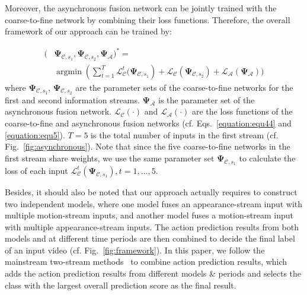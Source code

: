 \documentclass[letterpaper]{article} %
\DeclareMathOperator*{\argmin}{argmin}
\begin{document}

Moreover, the asynchronous fusion network can be jointly trained with the coarse-to-fine network by combining their loss functions. Therefore, the overall framework of our approach can be trained by:


\begin{equation}
\begin{aligned}
(&\mathbf{\Psi}_{\mathcal{C},s_1},\mathbf{\Psi}_{\mathcal{C},s_2},\mathbf{\Psi}_{\mathcal{A}})^*= \\ &\mathop{\argmin}{(\sum_{t=1}^T{\mathcal{L}_{\mathcal{C}}^{t}(\mathbf{\Psi}_{\mathcal{C},s_1}})}+  \mathcal{L}_{\mathcal{C}}(\mathbf{\Psi}_{\mathcal{C},s_2})+\mathcal{L}_{\mathcal{A}}(\mathbf{\Psi}_\mathcal{A}))
\end{aligned}
\label{equation:equ6}
\end{equation}
where $\mathbf{\Psi}_{\mathcal{C},s_1}$, $\mathbf{\Psi}_{\mathcal{C},s_2}$ are the parameter sets of the coarse-to-fine networks for the first and second information streams. $\mathbf{\Psi}_{\mathcal{A}}$ is the parameter set of the asynchronous fusion network. $\mathcal{L}_{\mathcal{C}}(\cdot)$ and $\mathcal{L}_{\mathcal{A}}(\cdot)$ are the loss functions of the coarse-to-fine and asynchronous fusion networks (cf. Eqs.~\ref{equation:equ44} and \ref{equation:equ5}). $T=5$ is the total number of inputs in the first stream (cf. Fig.~\ref{fig:asynchronous}). Note that since the five coarse-to-fine networks in the first stream share weights, we use the same parameter set $\mathbf{\Psi}_{\mathcal{C},s_1}$ to calculate the loss of each input $\mathcal{L}_{\mathcal{C}}^{t}(\mathbf{\Psi}_{\mathcal{C},s_1}), t=1,...,5$.

Besides, it should also be noted that our approach actually requires to construct two independent models, where one model fuses an appearance-stream input with multiple motion-stream inputs, and another model fuses a motion-stream input with multiple appearance-stream inputs. The action prediction results from both models and at different time periods are then combined to decide the final label of an input video (cf. Fig.~\ref{fig:framework}). In this paper, we follow the mainstream two-stream methods~\cite{TSN} to combine action prediction results, which adds the action prediction results from different models \& periods and selects the class with the largest overall prediction score as the final result.
\end{document}
